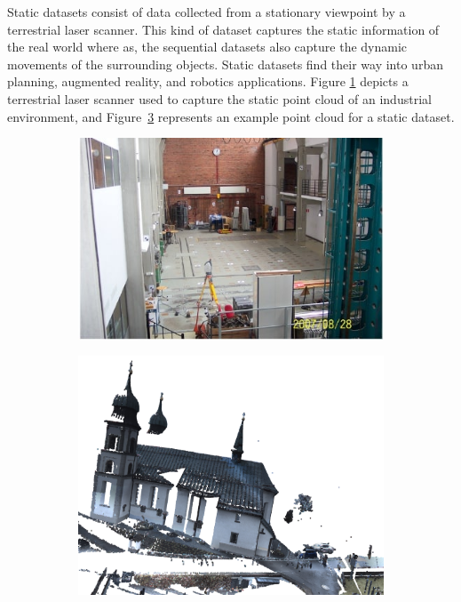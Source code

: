     
    Static datasets consist of data collected from a stationary viewpoint by a terrestrial laser scanner.
    This kind of dataset captures the static information of the real world where as, the sequential datasets also capture the dynamic movements of the surrounding objects.
    Static datasets find their way into urban planning, augmented reality, and robotics applications. 
    Figure \ref{fig:tls} depicts a terrestrial laser scanner used to capture the static point cloud of an industrial environment, and Figure~\ref{fig:static_scan} represents an example point cloud for a static dataset.
    \begin{figure}[h!]
        \centering
        \begin{subfigure}{0.45\textwidth}
            \includegraphics[scale=0.45]{images/TLS.jpg}
            \caption{}
            \label{fig:tls}
        \end{subfigure}
        \begin{subfigure}{0.45\textwidth}
            \centering
            \includegraphics[scale=0.2]{images/sem3d_data/1.pdf}
            \caption{}
            \label{fig:static_scan}
        \end{subfigure}


\end{figure}
